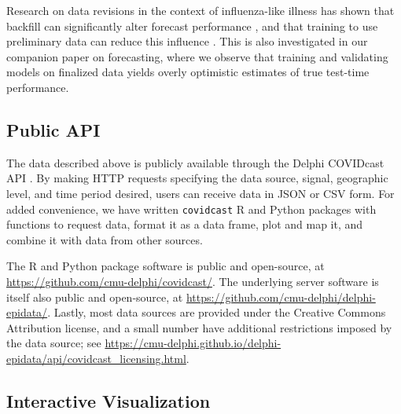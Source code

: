 \documentclass[9pt,twocolumn,twoside,lineno]{pnas-new}
\begin{document}
Research on data revisions in the context of influenza-like illness has shown
that backfill can significantly alter forecast performance \cite{Brooks:2018,
  Reich:2019}, and that training to use preliminary data can reduce this
influence \cite{Brooks:2018, Brooks:2020}. This is also investigated in our
companion paper on forecasting, where we observe that training and validating
models on finalized data yields overly optimistic estimates of true test-time
performance.  

\subsection{Public API}

The data described above is publicly available through the Delphi COVIDcast API
\cite{CovidcastAPI}.  By making HTTP requests specifying the data source,
signal, geographic level, and time period desired, users can receive data in
JSON or CSV form. For added convenience, we have written \texttt{covidcast} R
\cite{CovidcastR} and Python \cite{CovidcastPy} packages with functions to
request data, format it as a data frame, plot and map it, and combine it with
data from other sources.

The R and Python package software is public and open-source, at
\url{https://github.com/cmu-delphi/covidcast/}.  The underlying server software
is itself also public and open-source, at
\url{https://github.com/cmu-delphi/delphi-epidata/}.  Lastly, most data sources
are provided under the Creative Commons Attribution license, and a small number
have additional restrictions imposed by the data source; see
\url{https://cmu-delphi.github.io/delphi-epidata/api/covidcast_licensing.html}.

\subsection{Interactive Visualization}


\end{document}
